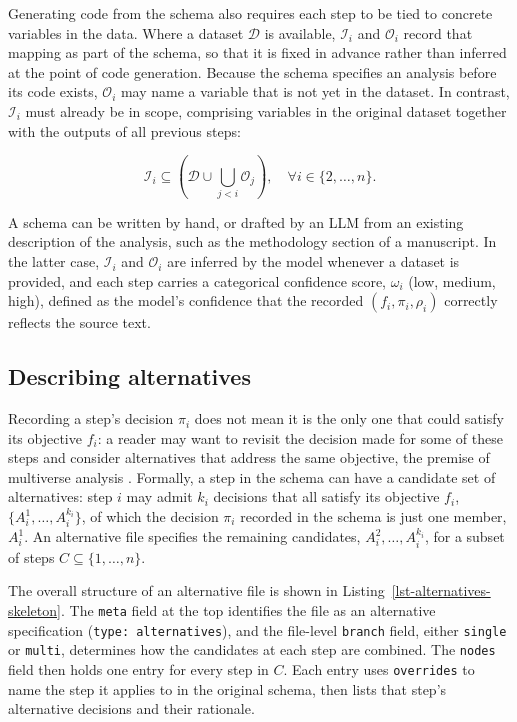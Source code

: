 \documentclass[aoas]{imsart}
\begin{document}
Generating code from the schema also requires each step to be tied to
concrete variables in the data. Where a dataset \(\mathcal{D}\) is
available, \(\mathcal{I}_i\) and \(\mathcal{O}_i\) record that mapping
as part of the schema, so that it is fixed in advance rather than
inferred at the point of code generation. Because the schema specifies
an analysis before its code exists, \(\mathcal{O}_i\) may name a
variable that is not yet in the dataset. In contrast, \(\mathcal{I}_i\)
must already be in scope, comprising variables in the original dataset
together with the outputs of all previous steps:

\[\mathcal{I}_{i} \subseteq \left( \mathcal{D} \cup \bigcup_{j < i} \mathcal{O}_{j} \right), \quad \forall i \in \{2, \dots, n\}.\]

A schema can be written by hand, or drafted by an LLM from an existing
description of the analysis, such as the methodology section of a
manuscript. In the latter case, \(\mathcal{I}_i\) and \(\mathcal{O}_i\)
are inferred by the model whenever a dataset is provided, and each step
carries a categorical confidence score, \(\omega_{i}\) (low, medium,
high), defined as the model's confidence that the recorded
\((f_i, \pi_i, \rho_i)\) correctly reflects the source text.

\subsection{Describing alternatives}\label{sec-alternative}

Recording a step's decision \(\pi_i\) does not mean it is the only one
that could satisfy its objective \(f_i\): a reader may want to revisit
the decision made for some of these steps and consider alternatives that
address the same objective, the premise of multiverse analysis
\citep{steegen2016, simonsohn2020}. Formally, a step in the schema can
have a candidate set of alternatives: step \(i\) may admit \(k_i\)
decisions that all satisfy its objective \(f_i\),
\(\{A_i^1, \dots, A_i^{k_i}\}\), of which the decision \(\pi_i\)
recorded in the schema is just one member, \(A_i^1\). An alternative
file specifies the remaining candidates, \(A_i^2, \dots, A_i^{k_i}\),
for a subset of steps \(C \subseteq \{1, \dots, n\}\).

The overall structure of an alternative file is shown in
Listing~\ref{lst-alternatives-skeleton}. The \texttt{meta} field at the
top identifies the file as an alternative specification
(\texttt{type:\ alternatives}), and the file-level \texttt{branch}
field, either \texttt{single} or \texttt{multi}, determines how the
candidates at each step are combined. The \texttt{nodes} field then
holds one entry for every step in \(C\). Each entry uses
\texttt{overrides} to name the step it applies to in the original
schema, then lists that step's alternative decisions and their
rationale.
\end{document}
